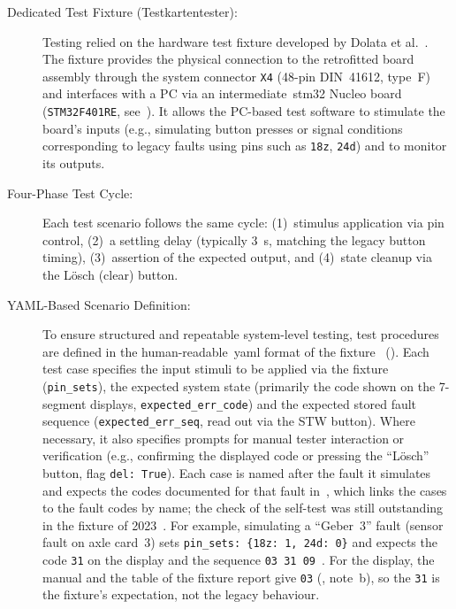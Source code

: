 \begin{description}
	\item[Dedicated Test Fixture (Testkartentester):] Testing relied on the hardware test fixture developed by Dolata et al.~\cite{dolata2023}. The fixture provides the physical connection to the retrofitted board assembly through the system connector \texttt{X4} (48-pin DIN~41612, type~F) and interfaces with a PC via an intermediate~\gls{stm32} Nucleo board (\texttt{STM32F401RE}, see~\cite[Sec.~6.2]{dolata2023}). It allows the PC-based test software to stimulate the board's inputs (e.g., simulating button presses or signal conditions corresponding to legacy faults using pins such as \texttt{18z}, \texttt{24d}) and to monitor its outputs.
	\item[Four-Phase Test Cycle:] Each test scenario follows the same cycle: (1)~stimulus application via pin control, (2)~a settling delay (typically \SI{3}{\second}, matching the legacy button timing), (3)~assertion of the expected output, and (4)~state cleanup via the Lösch (clear) button.
	\item[YAML-Based Scenario Definition:] To ensure structured and repeatable system-level testing, test procedures are defined in the human-readable~\gls{yaml} format of the fixture~\cite{dolata2023} (). Each test case specifies the input stimuli to be applied via the fixture (\texttt{pin\_sets}), the expected system state (primarily the code shown on the 7-segment displays, \texttt{expected\_err\_code}) and the expected stored fault sequence (\texttt{expected\_err\_seq}, read out via the STW button). Where necessary, it also specifies prompts for manual tester interaction or verification (e.g., confirming the displayed code or pressing the \enquote{Lösch} button, flag \texttt{del: True}). Each case is named after the fault it simulates and expects the codes documented for that fault in~\cite{rexroth1992wsp}, which links the cases to the fault codes by name; the check of the self-test was still outstanding in the fixture of 2023~\cite[Sec.~6.2]{dolata2023}. For example, simulating a \enquote{Geber~3} fault (sensor fault on axle card~3) sets \verb|pin_sets: {18z: 1, 24d: 0}| and expects the code \texttt{31} on the display and the sequence \texttt{03~31~09}~\cite{dolata2023}. For the display, the manual and the table of the fixture report give \texttt{03} (, note~b), so the \texttt{31} is the fixture's expectation, not the legacy behaviour.

\end{description}
